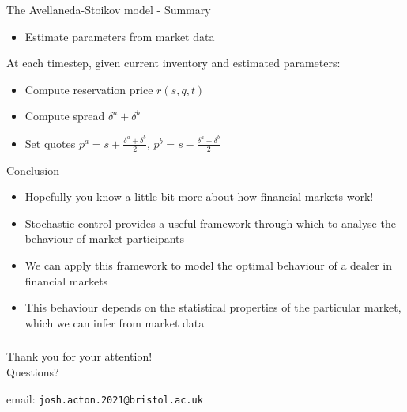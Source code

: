 \documentclass{beamer} %
\begin{document}
\begin{frame}{The Avellaneda-Stoikov model - Summary}
    \begin{itemize}
        \item Estimate parameters from market data
    \end{itemize}
    At each timestep, given current inventory and estimated parameters:
    \begin{itemize}
        \item Compute reservation price $r(s,q,t)$
        \item Compute spread $\delta^a+\delta^b$
        \item Set quotes $p^a=s+\frac{\delta^a+\delta^b}{2}$, $p^b=s-\frac{\delta^a+\delta^b}{2}$
    \end{itemize}
\end{frame}

\begin{frame}{Conclusion}
    \begin{itemize}
        \item Hopefully you know a little bit more about how financial markets work!
        \item Stochastic control provides a useful framework through which to analyse the behaviour of market participants
        \item We can apply this framework to model the optimal behaviour of a dealer in financial markets
        \item This behaviour depends on the statistical properties of the particular market, which we can infer from market data
    \end{itemize}
\end{frame}

\begin{frame}
    \frametitle{}
    \begin{center}
        \large{Thank you for your attention!}\\
        \vspace{1cm}
        Questions?
        \vspace{2cm}

        email: \texttt{josh.acton.2021@bristol.ac.uk}
    \end{center}
\end{frame}
\end{document}
